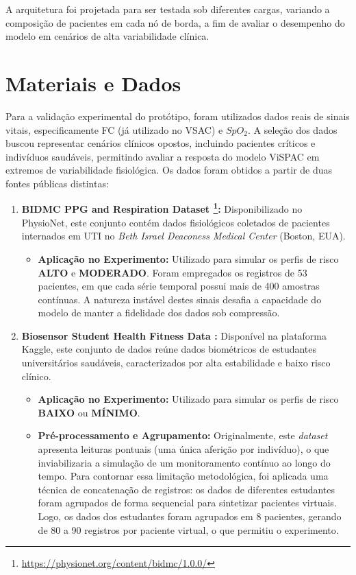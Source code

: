 \documentclass[twoside,english,brazilian]{UNISINOSmonografia}
\begin{document}
A arquitetura foi projetada para ser testada sob diferentes cargas, variando a composição de pacientes em cada nó de borda, a fim de avaliar o desempenho do modelo em cenários de alta variabilidade clínica.

\section{Materiais e Dados}
\label{sec:dataset}
Para a validação experimental do protótipo, foram utilizados dados reais de sinais vitais, especificamente FC (já utilizado no VSAC) e $SpO_2$. A seleção dos dados buscou representar cenários clínicos opostos, incluindo pacientes críticos e indivíduos saudáveis, permitindo avaliar a resposta do modelo ViSPAC em extremos de variabilidade fisiológica. Os dados foram obtidos a partir de duas fontes públicas distintas:

\begin{enumerate}
    \item \textbf{BIDMC PPG and Respiration Dataset \cite{Pimentel2016}\footnote{\url{https://physionet.org/content/bidmc/1.0.0/}}:} Disponibilizado no PhysioNet, este conjunto contém dados fisiológicos coletados de pacientes internados em UTI no \textit{Beth Israel Deaconess Medical Center} (Boston, EUA).
    \begin{itemize}
        \item \textbf{Aplicação no Experimento:} Utilizado para simular os perfis de risco \textbf{ALTO} e \textbf{MODERADO}. Foram empregados os registros de 53 pacientes, em que cada série temporal possui mais de 400 amostras contínuas. A natureza instável destes sinais desafia a capacidade do modelo de manter a fidelidade dos dados sob compressão.
    \end{itemize}

    \item \textbf{Biosensor Student Health Fitness Data \cite{BiosensorKaggle2024}:} Disponível na plataforma Kaggle, este conjunto de dados reúne dados biométricos de estudantes universitários saudáveis, caracterizados por alta estabilidade e baixo risco clínico.
    \begin{itemize}
        \item \textbf{Aplicação no Experimento:} Utilizado para simular os perfis de risco \textbf{BAIXO} ou \textbf{MÍNIMO}.
        \item \textbf{Pré-processamento e Agrupamento:} Originalmente, este \textit{dataset} apresenta leituras pontuais (uma única aferição por indivíduo), o que inviabilizaria a simulação de um monitoramento contínuo ao longo do tempo. Para contornar essa limitação metodológica, foi aplicada uma técnica de concatenação de registros: os dados de diferentes estudantes foram agrupados de forma sequencial para sintetizar pacientes virtuais. Logo, os dados dos estudantes foram agrupados em 8 pacientes, gerando de 80 a 90 registros por paciente virtual, o que permitiu o experimento.
    \end{itemize}
\end{enumerate}
\end{document}
